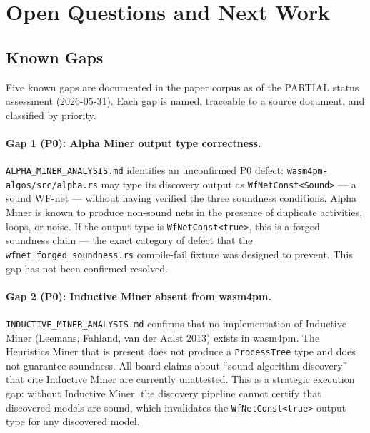 
\section{Open Questions and Next Work}
\label{sec:sources-papers-open}

\subsection{Known Gaps}
\label{sec:sources-papers-open-gaps}

Five known gaps are documented in the paper corpus as of the PARTIAL status
assessment (2026-05-31). Each gap is named, traceable to a source document,
and classified by priority.

\paragraph{Gap 1 (P0): Alpha Miner output type correctness.}
\texttt{ALPHA\_MINER\_ANALYSIS.md} identifies an unconfirmed P0 defect:
\texttt{wasm4pm-algos/src/alpha.rs} may type its discovery output as
\texttt{WfNetConst<Sound>} --- a sound WF-net --- without having verified the
three soundness conditions. Alpha Miner is known to produce non-sound nets in
the presence of duplicate activities, loops, or noise. If the output type is
\texttt{WfNetConst<true>}, this is a forged soundness claim --- the exact
category of defect that the \texttt{wfnet\_forged\_soundness.rs} compile-fail
fixture was designed to prevent. This gap has not been confirmed resolved.

\paragraph{Gap 2 (P0): Inductive Miner absent from wasm4pm.}
\texttt{INDUCTIVE\_MINER\_ANALYSIS.md} confirms that no implementation of
Inductive Miner (Leemans, Fahland, van der Aalst 2013) exists in wasm4pm. The
Heuristics Miner that is present does not produce a \texttt{ProcessTree} type
and does not guarantee soundness. All board claims about ``sound algorithm
discovery'' that cite Inductive Miner are currently unattested. This is a
strategic execution gap: without Inductive Miner, the discovery pipeline cannot
certify that discovered models are sound, which invalidates the
\texttt{WfNetConst<true>} output type for any discovered model.

